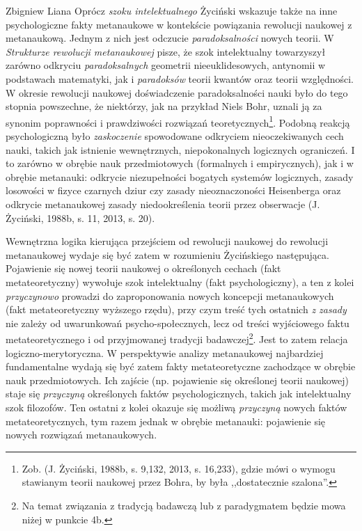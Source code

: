 \begin{artplenv}{Zbigniew Liana}
Oprócz \textit{szoku intelektualnego} Życiński wskazuje także na inne psychologiczne fakty metanaukowe w kontekście
powiązania rewolucji naukowej z metanaukową. Jednym z nich jest odczucie \textit{paradoksalności} nowych teorii. W
\textit{Strukturze rewolucji metanaukowej} pisze, że szok intelektualny towarzyszył zarówno odkryciu
\textit{paradoksalnych} geometrii nieeuklidesowych, antynomii w podstawach matematyki, jak i \textit{paradoksów} teorii
kwantów oraz teorii względności. W okresie rewolucji naukowej doświadczenie paradoksalności nauki było do tego stopnia
powszechne, że niektórzy, jak na przykład Niels Bohr, uznali ją za synonim poprawności i prawdziwości rozwiązań
teoretycznych\footnote{Zob. \label{ref:RNDsmv0TXVWdS}(J. Życiński, 1988b, s. 9,132, 2013, s. 16,233), gdzie mówi o
	wymogu stawianym teorii naukowej przez Bohra, by była ,,dostatecznie szalona''.}. Podobną reakcją psychologiczną było
\textit{zaskoczenie} spowodowane odkryciem nieoczekiwanych cech nauki, takich jak istnienie wewnętrznych, niepokonalnych
logicznych ograniczeń. I to zarówno w obrębie nauk przedmiotowych (formalnych i empirycznych), jak i w obrębie
metanauki: odkrycie niezupełności bogatych systemów logicznych, zasady losowości w fizyce czarnych dziur czy zasady
nieoznaczoności Heisenberga oraz odkrycie metanaukowej zasady niedookreślenia teorii przez obserwacje
\label{ref:RND6Rd4uQGI6n}(J. Życiński, 1988b, s. 11, 2013, s. 20).

Wewnętrzna logika kierująca przejściem od rewolucji naukowej do rewolucji metanaukowej wydaje się być zatem w rozumieniu
Życińskiego następująca. Pojawienie się nowej teorii naukowej o określonych cechach (fakt metateoretyczny) wywołuje
szok intelektualny (fakt psychologiczny), a ten z kolei \textit{przyczynowo} prowadzi do zaproponowania nowych koncepcji
metanaukowych (fakt metateoretyczny wyższego rzędu), przy czym treść tych ostatnich \textit{z zasady }nie zależy od
uwarunkowań psycho-społecznych, lecz od treści wyjściowego faktu metateoretycznego i od przyjmowanej tradycji
badawczej\footnote{Na temat związania z tradycją badawczą lub z paradygmatem będzie mowa niżej w punkcie 4b.}. Jest to
zatem relacja logiczno-merytoryczna. W perspektywie analizy metanaukowej najbardziej fundamentalne wydają się być zatem
fakty metateoretyczne zachodzące w obrębie nauk przedmiotowych. Ich zajście (np. pojawienie się określonej teorii
naukowej) staje się \textit{przyczyną} określonych faktów psychologicznych, takich jak intelektualny szok filozofów. Ten
ostatni z kolei okazuje się możliwą \textit{przyczyną} nowych faktów metateoretycznych, tym razem jednak w obrębie
metanauki: pojawienie się nowych rozwiązań metanaukowych.


\end{artplenv}
